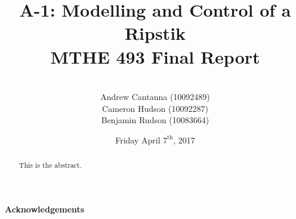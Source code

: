 \documentclass[11pt,letterpaper]{article}
\title{ A-1: Modelling and Control of a Ripstik\textsuperscript{\textregistered} \\MTHE 493 Final Report}
\date{Friday April $7^{\textrm{th}}$, 2017}
\author{\\Andrew Cantanna (10092489) \\Cameron Hudson (10092287)\\
	Benjamin Rudson (10083664)\\}
\theoremstyle{definition}
\begin{document}
	\begin{titlepage}
		\maketitle
		\thispagestyle{empty}		
	\end{titlepage}
	\newpage
\begin{abstract}
	This is the abstract.
\end{abstract}	
\clearpage
\newpage
\begin{center}
\textbf{Acknowledgements}
\end{center}

\newpage	
	\renewcommand{\baselinestretch}{0.75}\normalsize
	\tableofcontents
	\renewcommand{\baselinestretch}{1.0}\normalsize

\newpage
\listoffigures
\newpage
\listoftables


\clearpage
{}
	
	\newpage



	\pagestyle{fancy}







\newpage
\printbibliography
\end{document}
